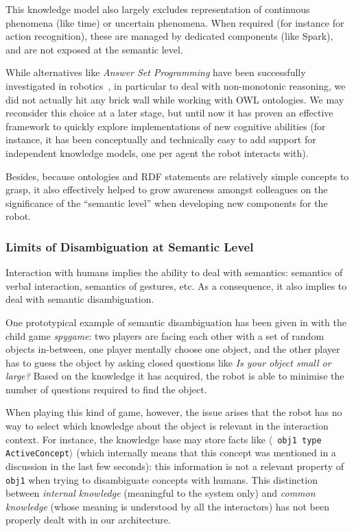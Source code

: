 \documentclass[preprint,3p,times]{elsarticle}
\newcommand{\concept}[1]{{\small \texttt{#1}}}
\newcommand{\stmt}[1]{{\footnotesize \tt $\langle$ #1\relax$\rangle$}}
\begin{document}
This knowledge model also largely excludes representation of continuous
phenomena (like time) or uncertain phenomena. When required (for instance for
action recognition), these are managed by dedicated components (like {\sc
Spark}), and are not exposed at the semantic level.

While alternatives like \emph{Answer Set Programming} have been
successfully investigated in robotics~\cite{Chen2010,Erdem2012}, in particular
to deal with non-monotonic reasoning, we did not actually hit any brick wall
while working with OWL ontologies. We may reconsider this choice at a later
stage, but until now it has proven an effective framework to quickly explore
implementations of new cognitive abilities (for instance, it has been
conceptually and technically easy to add support for independent knowledge
models, one per agent the robot interacts with).

Besides, because ontologies and RDF statements are relatively simple concepts
to grasp, it also effectively helped to grow awareness amongst colleagues on
the significance of the ``semantic level'' when developing new components for
the robot.

\subsubsection{Limits of Disambiguation at Semantic Level}

Interaction with humans implies the ability to deal with semantics: semantics of
verbal interaction, semantics of gestures, etc.  As a consequence, it also
implies to deal with semantic disambiguation.

One prototypical example of semantic disambiguation has been given in
\cite{Ros2010b} with the child game \emph{spygame}: two players are facing
each other with a set of random objects in-between, one player mentally choose
one object, and the other player has to guess the object by asking closed
questions like \emph{Is your object small or large?} Based on the knowledge it
has acquired, the robot is able to minimise the number of questions required to
find the object.

When playing this kind of game, however, the issue arises that the robot has no
way to select which knowledge about the object is relevant in the interaction
context. For instance, the knowledge base may store facts like \stmt{obj1 type
ActiveConcept} (which internally means that this concept was mentioned in a
discussion in the last few seconds): this information is not a relevant
property of \concept{obj1} when trying to disambiguate concepts with humans.
This distinction between \emph{internal knowledge} (meaningful to
the system only) and \emph{common knowledge} (whose meaning is understood by
all the interactors) has not been properly dealt with in our architecture.
\end{document}
